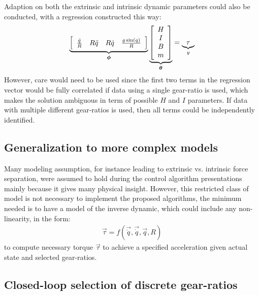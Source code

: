 Adaption on both the extrinsic and intrinsic dynamic parameters could also be conducted, with a regression constructed this way:
%
\begin{align}
	\underbrace{ \left[
	\begin{array}{c c c c}
		\frac{\ddot{q}}{R} &  R\ddot{q} & R \dot{q} & \frac{ g \sin( q ) }{R}
	\end{array} \right] }_{\vec{\phi}}
	\underbrace{ \left[
	\begin{array}{c}
		H \\ I \\ B \\ m
	\end{array} \right] }_{\vec{\theta}}
	 = \underbrace{ \tau }_{y}
\end{align}
%
However, care would need to be used since the first two terms in the regression vector would be fully correlated if data using a single gear-ratio is used, which makes the solution ambiguous in term of possible $H$ and $I$ parameters. If data with multiple different gear-ratios is used, then all terms could be independently identified. 


\subsection{Generalization to more complex models}

Many modeling assumption, for instance leading to extrinsic vs. intrinsic force separation, were assumed to hold during the control algorithm presentations mainly because it gives many physical insight. However, this restricted class of model is not necessary to implement the proposed algorithms, the minimum needed is to have a model of the inverse dynamic, which could include any non-linearity, in the form:
%
\begin{align}
	\vec{\tau}  = f( \vec{\ddot{q}} , \vec{\dot{q}} , \vec{q} , R )
\end{align}
%
to compute necessary torque $\vec{\tau}$ to achieve a specified acceleration given actual state and selected gear-ratios.


\subsection{Closed-loop selection of discrete gear-ratios}


